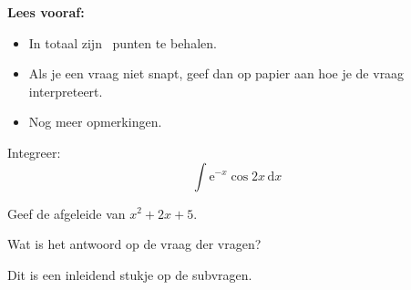\documentclass[12pt,dutch,addpoints]{tisdexam}
\begin{document}
\makecoverpage


\textbf{Lees vooraf:}
\begin{itemize}
\item In totaal zijn \numpoints\ punten te behalen.
\item Als je een vraag niet snapt, geef dan op papier aan hoe je de vraag interpreteert.
\item Nog meer opmerkingen.
\end{itemize}

\hrulefill

\begin{questions}


\question[5]
Integreer: \[\int \mathrm{e}^{-x}\cos 2x \, \mathrm{d}x\]

\question[5]
Geef de afgeleide van $x^2+2x+5$.

\question[2]
Wat is het antwoord op de vraag der vragen?
\begin{choices}
\end{choices}

\question
Dit is een inleidend stukje op de subvragen.

\end{questions}
\end{document}
